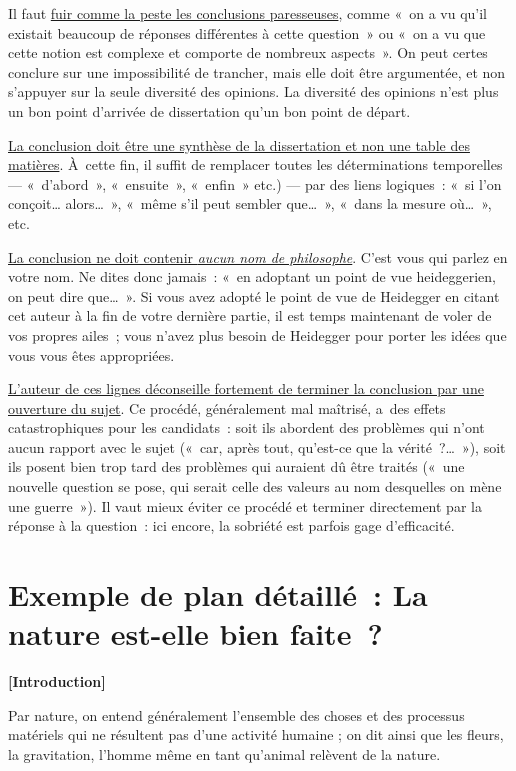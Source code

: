 \documentclass[a4paper,12pt]{article}
\begin{document}
Il faut \uline{fuir comme la peste les conclusions paresseuses}, comme « on a
vu qu'il existait beaucoup de réponses différentes à cette question » ou
« on a vu que cette notion est complexe et comporte de nombreux
aspects ». On peut certes conclure sur une impossibilité de trancher,
mais elle doit être argumentée, et non s'appuyer sur la seule diversité
des opinions. La diversité des opinions n'est plus un bon point
d'arrivée de dissertation qu'un bon point de départ.

\uline{La conclusion doit être une synthèse de la dissertation et non une
table des matières}. À cette fin, il suffit de remplacer toutes les
déterminations temporelles --- « d'abord », « ensuite », « enfin » etc.)
--- par des liens logiques : « si l'on conçoit\ldots{} alors\ldots{} », « même
s'il peut sembler que\ldots{} », « dans la mesure où\ldots{} », etc.

\uline{La conclusion ne doit contenir \emph{aucun nom de philosophe}}. C'est vous
qui parlez en votre nom. Ne dites donc jamais : « en adoptant un point
de vue heideggerien, on peut dire que\ldots{} ». Si vous avez adopté le point
de vue de Heidegger en citant cet auteur à la fin de votre dernière
partie, il est temps maintenant de voler de vos propres ailes ; vous
n'avez plus besoin de Heidegger pour porter les idées que vous vous êtes
appropriées.

\uline{L'auteur de ces lignes déconseille fortement de terminer la conclusion
par une ouverture du sujet}. Ce procédé, généralement mal maîtrisé,
a des effets catastrophiques pour les candidats : soit ils abordent des
problèmes qui n'ont aucun rapport avec le sujet (« car, après tout,
qu'est-ce que la vérité ?\ldots{} »), soit ils posent bien trop tard des
problèmes qui auraient dû être traités (« une nouvelle question se pose,
qui serait celle des valeurs au nom desquelles on mène une guerre »). Il
vaut mieux éviter ce procédé et terminer directement par la réponse à la
question : ici encore, la sobriété est parfois gage d'efficacité.

\section{Exemple de plan détaillé : La nature est-elle bien faite ?}
\label{sec:orgf6f6b66}
\label{orge26a681}

\textbf{[Introduction]}

Par nature, on entend généralement l'ensemble des
choses et des processus matériels qui ne résultent pas d'une activité
humaine ; on dit ainsi que les fleurs, la gravitation, l'homme même en
tant qu'animal relèvent de la nature.
\end{document}
